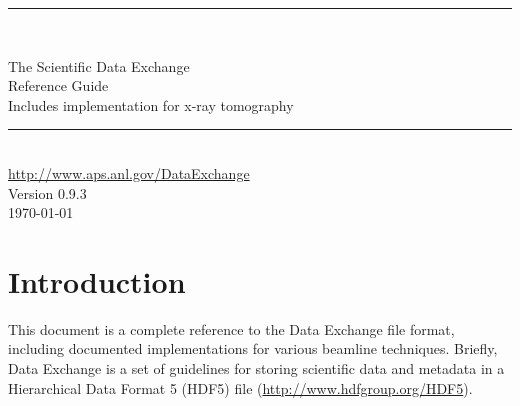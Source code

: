 \documentclass[usletter,11pt]{article}
\newcommand{\HRule}{{\color{brightOrange} \rule{\linewidth}{0.5mm}}}
\begin{document}
\pagestyle{empty}

\begin{center}
\vspace*{2.5cm}

\HRule \\[0.6cm]
\begin{spacing}{2.0}

{\color{softBlue} \Huge \sffamily The Scientific Data Exchange}\\[0.15cm]
{\color{softBlue} \Huge \sffamily Reference Guide}\\[0.15cm]
{\color{softBlue} \sffamily Includes implementation for x-ray tomography}\\[0.15cm]

\end{spacing}
\HRule \\[1.0cm]
{\Large \color{softBlue} \sffamily \url{http://www.aps.anl.gov/DataExchange}}\\[1.0cm]
{\Large \color{softBlue} \sffamily Version 0.9.3}\\[1.0cm]
{\Large \color{softBlue} \sffamily \today}

\end{center}
\newpage


\newpage

\pagestyle{fancy}

\tableofcontents


\newpage

\setcounter{page}{1}

\section{Introduction}

This document is a complete reference to the Data Exchange file format, 
including documented implementations for various beamline techniques. Briefly,
Data Exchange is a set of guidelines for storing scientific data and metadata
in a Hierarchical Data Format 5 (HDF5) file (\url{http://www.hdfgroup.org/HDF5}). 
\end{document}
